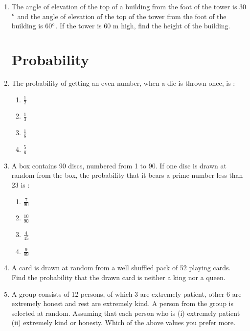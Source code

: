 \documentclass[10pt,-letter paper]{article}
\begin{document}
\begin{enumerate}
\item The angle of elevation of the top of a building from the foot of the tower is 30$\degree$ and the angle of elevation of the top of the tower from the foot of the building is 60$\degree$. If the tower is 60 m high, find the height of the building. 
  \section{Probability}
\item  The probability of getting an even number, when a die is thrown once, is :

 \begin{enumerate}
    \item $\frac{1}{2}$\\
    \item $\frac{1}{3}$\\
    \item $\frac{1}{6}$\\
    \item $\frac{5}{6}$
 \end{enumerate}
 \item A box contains 90 discs, numbered from 1 to 90. If one disc is drawn at random from the box, the probability that it bears a prime-number less than 23 is :
 
 \begin{enumerate}
    \item $\frac{7}{90}$\\
    \item $\frac{10}{90}$\\
    \item $\frac{4}{45}$\\
    \item $\frac{9}{89}$
 \end{enumerate}


\item A card is drawn at random from a well shuffled pack of 52 playing cards. Find the probability that the drawn card is neither a king nor a queen.

\item A group consists of 12 persons, of which 3 are extremely patient, other 6 are extremely honest and rest are extremely kind. A person from the group is selected at random. Assuming that each person who is (i) extremely patient (ii) extremely kind or honesty. Which of the above values you prefer more.

\end{enumerate}
\end{document}
